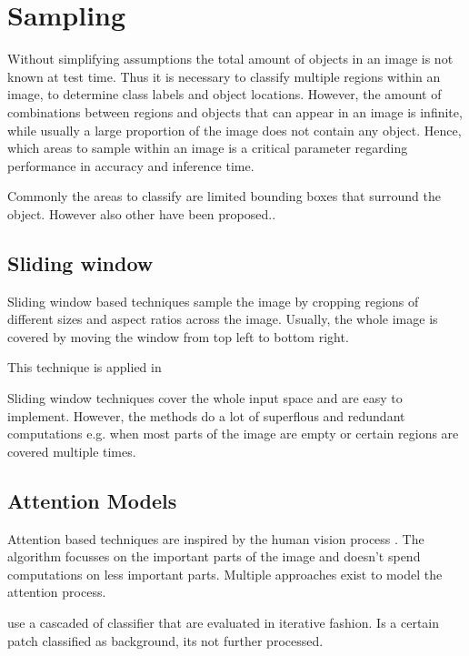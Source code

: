 	
	

	\section{Sampling}
	
	Without simplifying assumptions the total amount of objects in an image is not known at test time. Thus it is necessary to classify multiple regions within an image, to determine class labels and object locations. However, the amount of combinations between regions and objects that can appear in an image is infinite, while usually a large proportion of the image does not contain any object. Hence, which areas to sample within an image is a critical parameter regarding performance in accuracy and inference time.
	
	Commonly the areas to classify are limited bounding boxes that surround the object. However also other have been proposed..	
	
	
	
	\subsection{Sliding window}
	
	Sliding window based techniques sample the image by cropping regions of different sizes and aspect ratios across the image. Usually, the whole image is covered by moving the window from top left to bottom right. 
	
	This technique is applied in 
	
	Sliding window techniques cover the whole input space and are easy to implement. However, the methods do a lot of superflous and redundant computations e.g. when most parts of the image are empty or certain regions are covered multiple times.
	
	\subsection{Attention Models}
	
	Attention based techniques are inspired by the human vision process . The algorithm focusses on the important parts of the image and doesn't spend computations on less important parts. Multiple approaches exist to model the attention process.
	
	\citeauthor{Viola2004} use a cascaded of classifier that are evaluated in iterative fashion. Is a certain patch classified as background, its not further processed.
	
